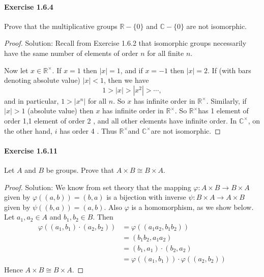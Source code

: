 \documentclass{article}
\theoremstyle{definition}
\begin{document}
\paragraph{Exercise 1.6.4} Prove that the multiplicative groups $\mathbb{R}-\{0\}$ and $\mathbb{C}-\{0\}$ are not isomorphic.
\begin{proof}
    Solution: Recall from Exercise 1.6.2 that isomorphic groups necessarily have the same number of elements of order $n$ for all finite $n$.

Now let $x \in \mathbb{R}^{\times}$. If $x=1$ then $|x|=1$, and if $x=-1$ then $|x|=2$. If (with bars denoting absolute value) $|x|<1$, then we have
$$
1>|x|>\left|x^2\right|>\cdots,
$$
and in particular, $1>\left|x^n\right|$ for all $n$. So $x$ has infinite order in $\mathbb{R}^{\times}$.
Similarly, if $|x|>1$ (absolute value) then $x$ has infinite order in $\mathbb{R}^{\times}$. So $\mathbb{R}^{\times}$has 1 element of order 1,1 element of order 2 , and all other elements have infinite order.
In $\mathbb{C}^{\times}$, on the other hand, $i$ has order 4 . Thus $\mathbb{R}^{\times}$and $\mathbb{C}^{\times}$are not isomorphic.
\end{proof}


\paragraph{Exercise 1.6.11} Let $A$ and $B$ be groups. Prove that $A \times B \cong B \times A$.
\begin{proof}
    Solution: We know from set theory that the mapping $\varphi: A \times B \rightarrow B \times A$ given by $\varphi((a, b))=(b, a)$ is a bijection with inverse $\psi: B \times A \rightarrow A \times B$ given by $\psi((b, a))=(a, b)$. Also $\varphi$ is a homomorphism, as we show below.
Let $a_1, a_2 \in A$ and $b_1, b_2 \in B$. Then
$$
\begin{aligned}
\varphi\left(\left(a_1, b_1\right) \cdot\left(a_2, b_2\right)\right) &=\varphi\left(\left(a_1 a_2, b_1 b_2\right)\right) \\
&=\left(b_1 b_2, a_1 a_2\right) \\
&=\left(b_1, a_1\right) \cdot\left(b_2, a_2\right) \\
&=\varphi\left(\left(a_1, b_1\right)\right) \cdot \varphi\left(\left(a_2, b_2\right)\right)
\end{aligned}
$$
Hence $A \times B \cong B \times A$.
\end{proof}
\end{document}
